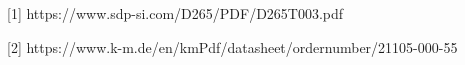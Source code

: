 \vspace{0.5cm}

[1] https://www.sdp-si.com/D265/PDF/D265T003.pdf

[2] https://www.k-m.de/en/kmPdf/datasheet/ordernumber/21105-000-55
